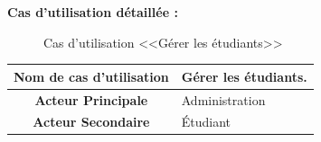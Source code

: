 \documentclass[12pt]{report}
\begin{document}
\newpage

\textbf{Cas d'utilisation détaillée :}

\begin{figure}[h]
\centering
    \centerline{}
    \caption{Cas d'utilisation <<Gérer les étudiants>>}
\end{figure}

\vspace{-0.1in}

\begin{table}[h]
\centering
\begin{tabular}{|c|l|}
\hline
\rowcolor[HTML]{ECF4FF} 
\textbf{Nom de cas d'utilisation}  & Gérer les étudiants.                                                                                                                                                                                                                                                                                                                                                                                                                                                                                                            \\ \hline
\rowcolor[HTML]{DAE8FC} 
\textbf{Acteur Principale}         & Administration                                                                                                                                                                                                                                                                                                                                                                                                                                                                                                                  \\ \hline
\rowcolor[HTML]{ECF4FF} 
\textbf{Acteur Secondaire}         & Étudiant                                                                                                                                                                                                                                                                                                                                                                                                                                                                                                                        \\ \hline

\end{tabular}
\end{table}
\end{document}
